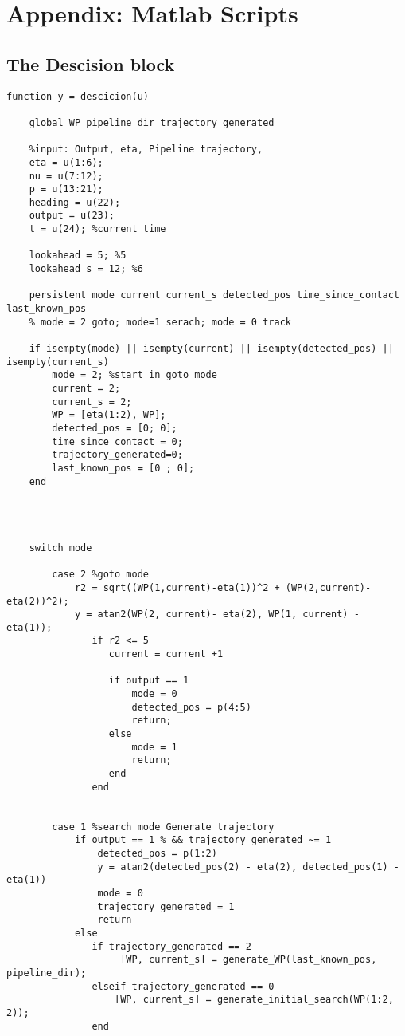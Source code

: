 \chapter{Appendix: Matlab Scripts}
\section{The Descision block}
\lstset{language=Matlab, basicstyle=\scriptsize}
 
\begin{lstlisting} 
function y = descicion(u)
    
    global WP pipeline_dir trajectory_generated
    
    %input: Output, eta, Pipeline trajectory,
    eta = u(1:6);
    nu = u(7:12);
    p = u(13:21);
    heading = u(22);
    output = u(23);
    t = u(24); %current time
    
    lookahead = 5; %5
    lookahead_s = 12; %6
    
    persistent mode current current_s detected_pos time_since_contact last_known_pos
    % mode = 2 goto; mode=1 serach; mode = 0 track
    
    if isempty(mode) || isempty(current) || isempty(detected_pos) || isempty(current_s)
        mode = 2; %start in goto mode
        current = 2;
        current_s = 2;
        WP = [eta(1:2), WP];
        detected_pos = [0; 0];
        time_since_contact = 0;
        trajectory_generated=0;
        last_known_pos = [0 ; 0];
    end
    
    
    
    
    switch mode
        
        case 2 %goto mode
            r2 = sqrt((WP(1,current)-eta(1))^2 + (WP(2,current)-eta(2))^2);
            y = atan2(WP(2, current)- eta(2), WP(1, current) - eta(1));
               if r2 <= 5
                  current = current +1
                  
                  if output == 1
                      mode = 0
                      detected_pos = p(4:5)
                      return;
                  else
                      mode = 1
                      return;
                  end
               end

            
        case 1 %search mode Generate trajectory
            if output == 1 % && trajectory_generated ~= 1
                detected_pos = p(1:2)
                y = atan2(detected_pos(2) - eta(2), detected_pos(1) - eta(1))
                mode = 0
                trajectory_generated = 1
                return
            else
               if trajectory_generated == 2
                    [WP, current_s] = generate_WP(last_known_pos, pipeline_dir);
               elseif trajectory_generated == 0
                   [WP, current_s] = generate_initial_search(WP(1:2, 2));
               end
               


\end{lstlisting}
